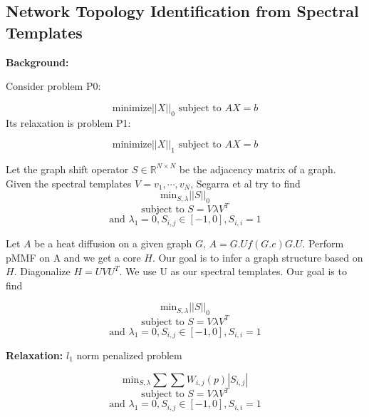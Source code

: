 \documentclass[a4paper]{article}
\newcommand{\R}{\mathbb{R}}
\newcommand{\mini}{\text{minimize}}
\newcommand{\st}{\text{ subject to }}
\begin{document}
\subsection{Network Topology Identification from Spectral Templates}

\textbf{Background:}

Consider problem P0:

$$\mini  ||X||_0 \st AX = b$$ 
Its relaxation is problem P1:

$$\mini  ||X||_1 \st AX = b$$ 




Let the graph shift operator $S \in \R^{N\times N}$ be the adjacency matrix of a graph. Given the spectral templates $V = {v_1, \cdots, v_N}$, Segarra et al try to find
$$\text{min}_{S, \lambda} ||S||_0 $$
$$\text{subject to } S = V\lambda V^T $$
$$\text{and } \lambda_{1} =0, S_{i,j} \in [-1,0], S_{i,i} =1$$

Let $A$ be a heat diffusion on a given graph $G$, $A = G.Uf(G.e)G.U$. Perform pMMF on A and we get a core $H$. Our goal is to infer a graph structure based on $H$. Diagonalize $H = UVU^T$. We use U as our spectral templates. Our goal is to find

$$\text{min}_{S, \lambda} ||S||_0 $$
$$\text{subject to } S = V\lambda V^T $$
$$\text{and } \lambda_{1} =0, S_{i,j} \in [-1,0], S_{i,i} =1$$

\textbf{Relaxation:} $l_1$ norm penalized problem

$$\text{min}_{S, \lambda} \sum\sum W_{i,j}(p)|S_{i,j}| $$
$$\text{subject to } S = V\lambda V^T $$
$$\text{and } \lambda_{1} =0, S_{i,j} \in [-1,0], S_{i,i} =1$$

\end{document}
